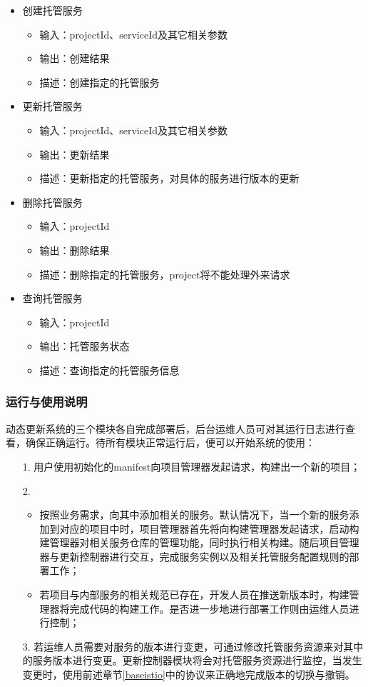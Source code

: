 \documentclass[a4paper, 12pt]{article}
\theoremstyle{definition}
\begin{document}
\begin{itemize}
	\item{创建托管服务
		\begin{itemize}
		\item 输入：projectId、serviceId及其它相关参数
		\item 输出：创建结果
		\item 描述：创建指定的托管服务
		\end{itemize}}
	\item{更新托管服务
		\begin{itemize}
		\item 输入：projectId、serviceId及其它相关参数
		\item 输出：更新结果
		\item 描述：更新指定的托管服务，对具体的服务进行版本的更新
		\end{itemize}}
	\item{删除托管服务
		\begin{itemize}
		\item 输入：projectId
		\item 输出：删除结果
		\item 描述：删除指定的托管服务，project将不能处理外来请求
		\end{itemize}}
	\item{查询托管服务
		\begin{itemize}
		\item 输入：projectId
		\item 输出：托管服务状态
		\item 描述：查询指定的托管服务信息
		\end{itemize}}
\end{itemize}

\subsubsection{运行与使用说明}

动态更新系统的三个模块各自完成部署后，后台运维人员可对其运行日志进行查看，确保正确运行。待所有模块正常运行后，便可以开始系统的使用：

\begin{enumerate}
	\item [1.] 用户使用初始化的manifest向项目管理器发起请求，构建出一个新的项目；
	\item [2.] 
		\begin{itemize} 
			\item 按照业务需求，向其中添加相关的服务。默认情况下，当一个新的服务添加到对应的项目中时，项目管理器首先将向构建管理器发起请求，启动构建管理器对相关服务仓库的管理功能，同时执行相关构建。随后项目管理器与更新控制器进行交互，完成服务实例以及相关托管服务配置规则的部署工作；
			\item  若项目与内部服务的相关规范已存在，开发人员在推送新版本时，构建管理器将完成代码的构建工作。是否进一步地进行部署工作则由运维人员进行控制；
		\end{itemize}
	\item [3.] 若运维人员需要对服务的版本进行变更，可通过修改托管服务资源来对其中的服务版本进行变更。更新控制器模块将会对托管服务资源进行监控，当发生变更时，使用前述章节\ref{baseistio}中的协议来正确地完成版本的切换与撤销。
\end{enumerate}
\end{document}

